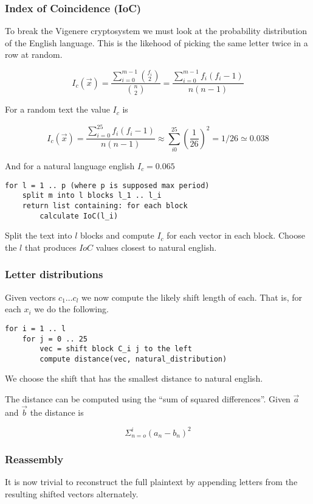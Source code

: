 \subsubsection{Index of Coincidence (IoC)}
To break the Vigenere cryptosystem we must look at the probability
distribution of the English language. This is the likehood of picking
the same letter twice in a row at random.

\[ I_c(\vec{x}) =
\frac{\sum^{m-1}_{i=0}\binom{f_i}{2}}{\binom{n}{2}}=
\frac{\sum^{m-1}_{i=0}f_i(f_i - 1)}{n(n-1)}\]

For a random text the value $I_c$ is

\[ I_c(\vec{x}) =
\frac{\sum^{25}_{i=0}f_i(f_i - 1)}{n(n-1)} \approx
\sum^{25}_{i0}(\frac{1}{26})^2= 1/26 \simeq 0.038\]

And for a natural language english $I_c = 0.065$

\begin{verbatim}
for l = 1 .. p (where p is supposed max period)
    split m into l blocks l_1 .. l_i
    return list containing: for each block
        calculate IoC(l_i)
\end{verbatim}

Split the text into $l$ blocks and compute $I_c$ for each vector in
each block. Choose the $l$ that produces $IoC$ values closest to
natural english.

\subsubsection{Letter distributions}
Given vectors $c_1 \ldots c_l$ we now compute the likely shift length
of each. That is, for each $x_i$ we do the following.

\begin{verbatim}
for i = 1 .. l
    for j = 0 .. 25
        vec = shift block C_i j to the left
        compute distance(vec, natural_distribution)
\end{verbatim}

We choose the shift that has the smallest distance to natural english.

The distance can be computed using the ``sum of squared
differences''. Given $\overrightarrow{a}$ and $\overrightarrow{b}$ the
distance is

\[\Sigma_{n=o}^i (a_n - b_n)^2 \]


\subsubsection{Reassembly}
It is now trivial to reconstruct the full plaintext by appending
letters from the resulting shifted vectors alternately.
